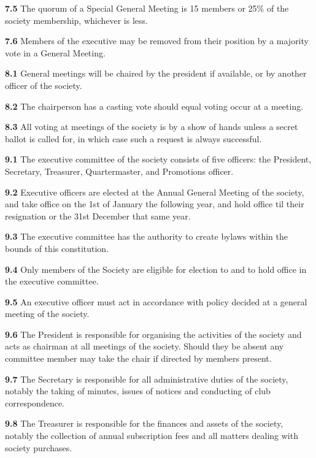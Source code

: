 \textbf{7.5} The quorum of a Special General Meeting is 15 members or 25\% of the society membership, whichever is less.

\textbf{7.6} Members of the executive may be removed from their position by a majority vote in a General Meeting.

\vspace{1em}

\textbf{8.1} General meetings will be chaired by the president if available, or by another officer of the society.

\textbf{8.2} The chairperson has a casting vote should equal voting occur at a meeting.

\textbf{8.3} All voting at meetings of the society is by a show of hands unless a secret ballot is called for, in which case such a request is always successful.

\vspace{1em}

\textbf{9.1} The executive committee of the society consists of five officers: the President, Secretary, Treasurer, Quartermaster, and Promotions officer.

\textbf{9.2} Executive officers are elected at the Annual General Meeting of the society, and take office on the 1st of January the following year, and hold office til their resignation or the 31st December that same year.

\textbf{9.3} The executive committee has the authority to create bylaws within the bounds of this constitution.

\textbf{9.4} Only members of the Society are eligible for election to and to hold office in the executive committee.

\textbf{9.5} An executive officer must act in accordance with policy decided at a general meeting of the society.

\textbf{9.6} The President is responsible for organising the activities of the society and acts as chairman at all meetings of the society. Should they be absent any committee member may take the chair if directed by members present.

\textbf{9.7} The Secretary is responsible for all administrative duties of the society, notably the taking of minutes, issues of notices and conducting of club correspondence.

\textbf{9.8} The Treasurer is responsible for the finances and assets of the society, notably the collection of annual subscription fees and all matters dealing with society purchases.

